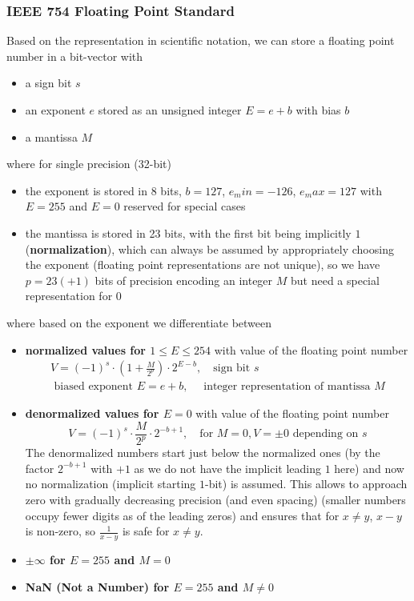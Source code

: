 \subsubsection{IEEE 754 Floating Point Standard}
Based on the representation in scientific notation, we can store a floating point number in a bit-vector with
\begin{itemize}
    \item a sign bit $s$
    \item an exponent $e$ stored as an unsigned integer $E = e + b$ with bias $b$
    \item a mantissa $M$
\end{itemize}
where for single precision (32-bit)
\begin{itemize}
    \item the exponent is stored in 8 bits, $b = 127$, $e_min = -126$, $e_max = 127$ with $E = 255$ and $E = 0$ reserved for special cases
    \item the mantissa is stored in 23 bits, with the first bit being implicitly $1$ (\textbf{normalization}), which can always be assumed by appropriately choosing the exponent (floating point representations are not unique), so we have $p = 23(+1)$ bits of precision encoding an integer $M$ but need a special representation for $0$
\end{itemize}
where based on the exponent we differentiate between
\begin{itemize}
    \item \textbf{normalized values for $1 \leq E \leq 254$}  with value of the floating point number
    \begin{equation}
        \begin{multlined}
            V = (-1)^s \cdot \left(1 + \frac{M}{2^p}\right) \cdot 2^{E-b}, \quad \text{sign bit } s\\
            \text{ biased exponent } E = e + b, \quad \text{ integer representation of mantissa } M
        \end{multlined}
    \end{equation}
    \item \textbf{denormalized values for $E = 0$} with value of the floating point number
    \begin{equation}
        V = (-1)^s \cdot \frac{M}{2^p} \cdot 2^{-b + 1},  \quad \text{for } M = 0, V = \pm 0 \text{ depending on } s
    \end{equation}
    The denormalized numbers start just below the normalized ones (by the factor $2^{-b + 1}$ with $+1$ as we do not have the implicit leading $1$ here) and now no normalization (implicit starting $1$-bit) is assumed. This 
    allows to approach zero with gradually decreasing precision (and even spacing) (smaller numbers occupy fewer digits as of the leading zeros) and ensures that for $x\ne y$, $x-y$ is non-zero, so $\frac{1}{x-y}$ is safe for $x \ne y$.
    \item \textbf{$\pm \infty$ for $E = 255$ and $M = 0$}
    \item \textbf{NaN (Not a Number) for $E = 255$ and $M \ne 0$}
\end{itemize}


